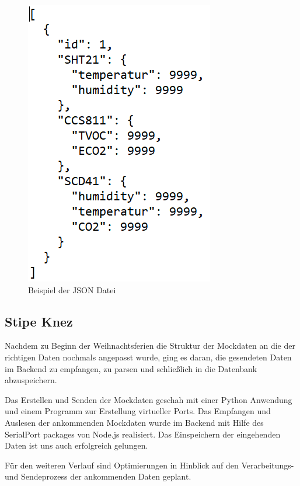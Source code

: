 \documentclass[]{article}
\begin{document}
\begin{figure}[h]
	\centering
	\includegraphics[scale=0.50]{images/JSON_format}
	\caption{Beispiel der JSON Datei}
	\label{img:JSON_format}
\end{figure}

\subsection{Stipe Knez}
Nachdem zu Beginn der Weihnachtsferien die Struktur der Mockdaten an die der richtigen Daten nochmals angepasst wurde, ging es daran, die gesendeten Daten im Backend zu empfangen, zu parsen und schließlich in die Datenbank abzuspeichern.
 
Das Erstellen und Senden der Mockdaten geschah mit einer Python Anwendung und einem Programm zur Erstellung virtueller Ports. Das Empfangen und Auslesen der ankommenden Mockdaten wurde im Backend mit Hilfe des  SerialPort packages von Node.js realisiert. Das Einspeichern der eingehenden Daten ist uns auch erfolgreich gelungen.

Für den weiteren Verlauf sind Optimierungen in Hinblick auf den Verarbeitungs- und Sendeprozess der ankommenden Daten geplant.
\end{document}
